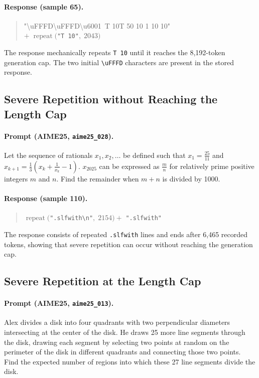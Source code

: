 \paragraph{Response (sample 65).}
\begin{quote}
\small\ttfamily
"\textbackslash uFFFD\textbackslash uFFFD\textbackslash u6001\ T 10T 50 10 1 10 10"\\
\normalfont $+\;\operatorname{repeat}($\texttt{"T 10"}$,\;2043)$
\end{quote}
The response mechanically repeats \texttt{T 10} until it reaches the
8,192-token generation cap. The two initial
\texttt{\textbackslash uFFFD} characters are present in the stored response.

\subsection{Severe Repetition without Reaching the Length Cap}

\paragraph{Prompt (AIME25, \texttt{aime25\_028}).}
Let the sequence of rationals $x_1,x_2,\ldots$ be defined such that
$x_1=\frac{25}{11}$ and
$x_{k+1}=\frac{1}{3}\left(x_k+\frac{1}{x_k}-1\right)$.
$x_{2025}$ can be expressed as $\frac{m}{n}$ for relatively prime positive
integers $m$ and $n$. Find the remainder when $m+n$ is divided by 1000.

\paragraph{Response (sample 110).}
\begin{quote}
\small
$\operatorname{repeat}($\texttt{".slfwith\textbackslash n"}$,\;2154)
+$ \texttt{".slfwith"}
\end{quote}
The response consists of repeated \texttt{.slfwith} lines and ends after
6,465 recorded tokens, showing that severe repetition can occur without
reaching the generation cap.

\subsection{Severe Repetition at the Length Cap}

\paragraph{Prompt (AIME25, \texttt{aime25\_013}).}
Alex divides a disk into four quadrants with two perpendicular diameters
intersecting at the center of the disk. He draws 25 more line segments
through the disk, drawing each segment by selecting two points at random
on the perimeter of the disk in different quadrants and connecting those
two points. Find the expected number of regions into which these 27 line
segments divide the disk.

